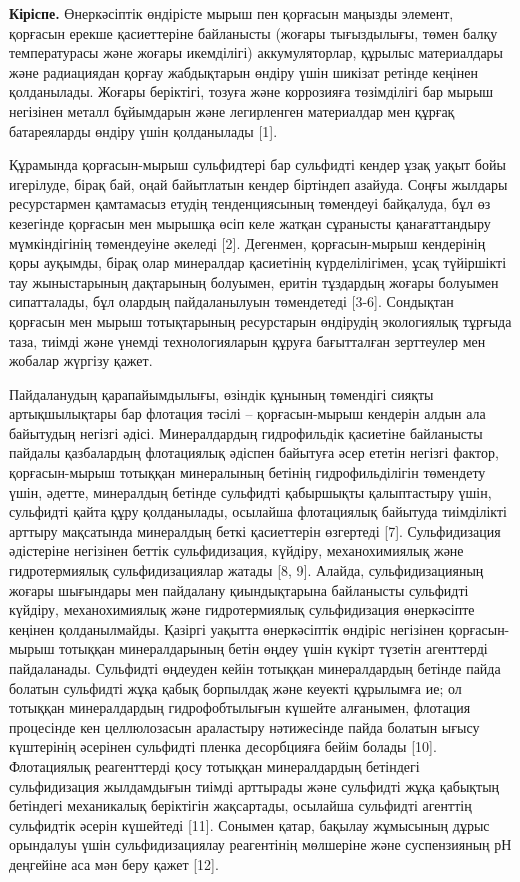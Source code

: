 \begin{multicols}{2}
{\bfseries Кіріспе.} Өнеркәсіптік өндірісте мырыш пен қорғасын маңызды
элемент, қорғасын ерекше қасиеттеріне байланысты (жоғары тығыздылығы,
төмен балқу температурасы және жоғары икемділігі) аккумуляторлар,
құрылыс материалдары және радиациядан қорғау жабдықтарын өндіру үшін
шикізат ретінде кеңінен қолданылады. Жоғары беріктігі, тозуға және
коррозияға төзімділігі бар мырыш негізінен металл бұйымдарын және
легирленген материалдар мен құрғақ батареяларды өндіру үшін қолданылады
{[}1{]}.

Құрамында қорғасын-мырыш сульфидтері бар сульфидті кендер ұзақ уақыт
бойы игерілуде, бірақ бай, оңай байытлатын кендер біртіндеп азайуда.
Соңғы жылдары ресурстармен қамтамасыз етудің тенденциясының төмендеуі
байқалуда, бұл өз кезегінде қорғасын мен мырышқа өсіп келе жатқан
сұранысты қанағаттандыру мүмкіндігінің төмендеуіне әкеледі {[}2{]}.
Дегенмен, қорғасын-мырыш кендерінің қоры ауқымды, бірақ олар минералдар
қасиетінің күрделілігімен, ұсақ түйіршікті тау жыныстарының дақтарының
болуымен, еритін тұздардың жоғары болуымен сипатталады, бұл олардың
пайдаланылуын төмендетеді {[}3-6{]}. Сондықтан қорғасын мен мырыш
тотықтарының ресурстарын өндірудің экологиялық тұрғыда таза, тиімді және
үнемді технологияларын құруға бағытталған зерттеулер мен жобалар жүргізу
қажет.

Пайдаланудың қарапайымдылығы, өзіндік құнының төмендігі сияқты
артықшылықтары бар флотация тәсілі -- қорғасын-мырыш кендерін алдын ала
байытудың негізгі әдісі. Минералдардың гидрофильдік қасиетіне байланысты
пайдалы қазбалардың флотациялық әдіспен байытуға әсер ететін негізгі
фактор, қорғасын-мырыш тотыққан минералының бетінің гидрофильділігін
төмендету үшін, әдетте, минералдың бетінде сульфидті қабыршықты
қалыптастыру үшін, сульфидті қайта құру қолданылады, осылайша
флотациялық байытуда тиімділікті арттыру мақсатында минералдың беткі
қасиеттерін өзгертеді {[}7{]}. Сульфидизация әдістеріне негізінен беттік
сульфидизация, күйдіру, механохимиялық және гидротермиялық
сульфидизациялар жатады {[}8, 9{]}. Алайда, сульфидизацияның жоғары
шығындары мен пайдалану қиындықтарына байланысты сульфидті күйдіру,
механохимиялық және гидротермиялық сульфидизация өнеркәсіпте кеңінен
қолданылмайды. Қазіргі уақытта өнеркәсіптік өндіріс негізінен
қорғасын-мырыш тотыққан минералдарының бетін өңдеу үшін күкірт түзетін
агенттерді пайдаланады. Сульфидті өңдеуден кейін тотыққан минералдардың
бетінде пайда болатын сульфидті жұқа қабық борпылдақ және кеуекті
құрылымға ие; ол тотыққан минералдардың гидрофобтылығын күшейте
алғанымен, флотация процесінде кен целлюлозасын араластыру нәтижесінде
пайда болатын ығысу күштерінің әсерінен сульфидті пленка десорбцияға
бейім болады {[}10{]}. Флотациялық реагенттерді қосу тотыққан
минералдардың бетіндегі сульфидизация жылдамдығын тиімді арттырады және
сульфидті жұқа қабықтың бетіндегі механикалық беріктігін жақсартады,
осылайша сульфидті агенттің сульфидтік әсерін күшейтеді {[}11{]}.
Сонымен қатар, бақылау жұмысының дұрыс орындалуы үшін сульфидизациялау
реагентінің мөлшеріне және суспензияның рН деңгейіне аса мән беру қажет
{[}12{]}.


\end{multicols}
